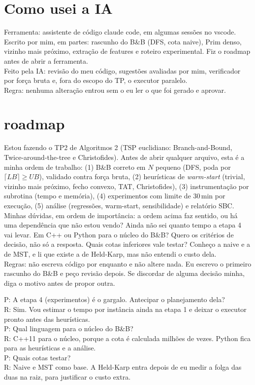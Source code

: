 \documentclass[11pt,a4paper]{article}
\newcommand{\rotulo}[1]{\vspace{0.9em}\noindent{\bfseries\small #1}\par\vspace{0.4em}}
\newenvironment{bloco}{%
  \list{}{\leftmargin=0.5cm\rightmargin=0pt\itemsep=0pt\topsep=0pt\parsep=0pt\listparindent=0pt}%
  \item\relax}{\endlist}
\begin{document}
\section*{Como usei a IA}
\begin{bloco}
Ferramenta: assistente de código claude code, em algumas sessões no vscode.\\
Escrito por mim, em partes: rascunho do B\&B (DFS, cota naive), Prim denso, vizinho mais próximo, extração de features e roteiro experimental. Fiz o roadmap antes de abrir a ferramenta.\\
Feito pela IA: revisão do meu código, sugestões avaliadas por mim, verificador por força bruta e, fora do escopo do TP, o executor paralelo.\\
Regra: nenhuma alteração entrou sem o eu ler o que foi gerado e aprovar.
\end{bloco}

\section*{roadmap}
\rotulo{Prompt}
\begin{bloco}
Estou fazendo o TP2 de Algoritmos 2 (TSP euclidiano: Branch-and-Bound, Twice-around-the-tree e Christofides). Antes de abrir qualquer arquivo, esta é a minha ordem de trabalho: (1) B\&B correto em $N$ pequeno (DFS, poda por $\lceil LB \rceil \geq UB$), validado contra força bruta, (2) heurísticas de \textit{warm-start} (trivial, vizinho mais próximo, fecho convexo, TAT, Christofides), (3) instrumentação por subrotina (tempo e memória), (4) experimentos com limite de 30\,min por execução, (5) análise (regressões, warm-start, sensibilidade) e relatório SBC.\\
Minhas dúvidas, em ordem de importância: a ordem acima faz sentido, ou há uma dependência que não estou vendo? Ainda não sei quanto tempo a etapa 4 vai levar. Em C++ ou Python para o núcleo do B\&B? Quero os critérios de decisão, não só a resposta. Quais cotas inferiores vale testar? Conheço a naive e a de MST, e li que existe a de Held-Karp, mas não entendi o custo dela.\\
Regras: não escreva código por enquanto e não altere nada. Eu escrevo o primeiro rascunho do B\&B e peço revisão depois. Se discordar de alguma decisão minha, diga o motivo antes de propor outra.
\end{bloco}

\rotulo{Decisão}
\begin{bloco}
P: A etapa 4 (experimentos) é o gargalo. Antecipar o planejamento dela?\\
R: Sim. Vou estimar o tempo por instância ainda na etapa 1 e deixar o executor pronto antes das heurísticas.\\
P: Qual linguagem para o núcleo do B\&B?\\
R: C++11 para o núcleo, porque a cota é calculada milhões de vezes. Python fica para as heurísticas e a análise.\\
P: Quais cotas testar?\\
R: Naive e MST como base. A Held-Karp entra depois de eu medir a folga das duas na raiz, para justificar o custo extra.
\end{bloco}
\end{document}
